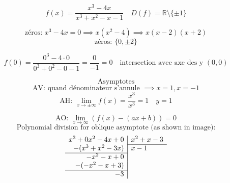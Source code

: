 \documentclass{article}
\begin{document}
\[
f(x) = \frac{x^3 - 4x}{x^3 + x^2 - x - 1} \quad D(f) = \mathbb{R} \setminus \{\pm1\}
\]

\[
\text{zéros: } x^3 - 4x = 0 \implies x(x^2 - 4) \implies x(x-2)(x+2)
\]
\[
\text{zéros: } \{0, \pm 2\}
\]

\[
f(0) = \frac{0^3 - 4 \cdot 0}{0^3 + 0^2 - 0 - 1} = \frac{0}{-1} = 0 \quad \text{intersection avec axe des y } (0,0)
\]

\[
\text{Asymptotes}
\]
\[
\text{AV: quand dénominateur s'annule } \implies x = 1, x = -1
\]
\[
\text{AH: } \lim_{x \to \pm\infty} f(x) = \frac{x^3}{x^3} = 1 \quad y = 1
\]

\[
\text{AO: } \lim_{x \to \infty} (f(x) - (ax+b)) = 0
\]
\[
\text{Polynomial division for oblique asymptote (as shown in image):}
\]
\[
\begin{array}{r|l}
x^3 + 0x^2 - 4x + 0 & x^2 + x - 3 \\
\cline{2-2}
-(x^3 + x^2 - 3x) & x - 1 \\
\cline{1-1}
\quad -x^2 - x + 0 & \\
-(-x^2 - x + 3) & \\
\cline{1-1}
\quad \quad \quad -3 & \\
\end{array}
\]
\end{document}
